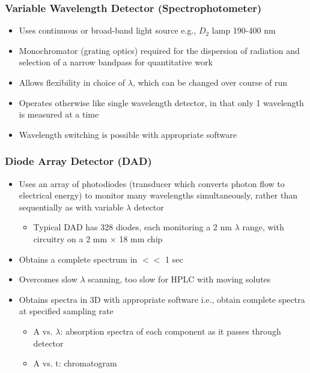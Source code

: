 \documentclass[a4paper, 12pt]{article}
\begin{document}
\subsubsection{Variable Wavelength Detector (Spectrophotometer)}

\begin{itemize}
	\item Uses continuous or broad-band light source e.g., $D_2$ lamp 190-400 nm
	\item Monochromator (grating optics) required for the dispersion of radiation and selection of a narrow bandpass for quantitative work
	\item Allows flexibility in choice of $\lambda$, which can be changed over course of run
	\item Operates otherwise like single wavelength detector, in that only 1 wavelength is measured at a time
	\item Wavelength switching is possible with appropriate software
\end{itemize}

\subsubsection{Diode Array Detector (DAD)}

\begin{itemize}
	\item Uses an array of photodiodes (transducer which converts photon flow to electrical energy) to monitor many wavelengths simultaneously, rather than sequentially as with variable $\lambda$ detector
	\begin{itemize}
		\item Typical DAD has 328 diodes, each monitoring a 2 nm $\lambda$ range, with circuitry on a 2 mm $\times$ 18 mm chip
	\end{itemize}
	\item Obtains a complete spectrum in $<<$ 1 sec
	\item Overcomes slow $\lambda$ scanning, too slow for HPLC with moving solutes
	\item Obtains spectra in 3D with appropriate software i.e., obtain complete spectra at specified sampling rate
	\begin{itemize}
		\item A vs. $\lambda$:  absorption spectra of each component as it passes through detector
		\item A vs. t: chromatogram
	\end{itemize}
\end{itemize}
\end{document}
